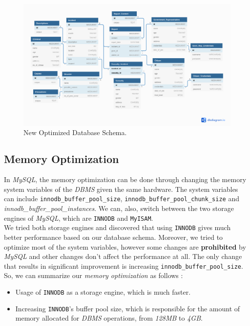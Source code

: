 \begin{figure}[H]
    \centering
    \includegraphics[width=\textwidth]{images/stats/optimized-schema.png}
    \caption{New Optimized Database Schema.}
    \label{fig:db-schema}
\end{figure}

\subsection{Memory Optimization}
In \emph{MySQL}, the memory optimization can be done through changing the memory system variables of the \emph{DBMS} given the same hardware. The system variables can include \texttt{innodb\_buffer\_pool\_size}, \texttt{innodb\_buffer\_pool\_chunk\_size} and \emph{innodb\_buffer\_pool\_instances}. We can, also, switch between the two storage engines of \emph{MySQL}, which are \texttt{INNODB} and \texttt{MyISAM}. \\

We tried both storage engines and discovered that using \texttt{INNODB} gives much better performance based on our database schema. Moreover, we tried to optimize most of the system variables, however some changes are \textbf{prohibited} by \emph{MySQL} and other changes don't affect the performance at all. The only change that results in significant improvement is increasing \texttt{innodb\_buffer\_pool\_size}. \\

So, we can summarize our \emph{memory optimization} as follows :
\begin{itemize}
    \item Usage of \texttt{INNODB} as a storage engine, which is much faster.
    \item Increasing \texttt{INNODB}'s buffer pool size, which is responsible for the amount of memory allocated for \emph{DBMS} operations, from \emph{128MB} to \emph{4GB}.
\end{itemize}

